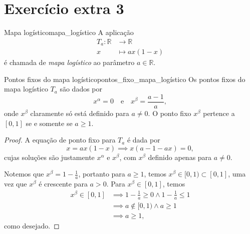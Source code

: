 \section*{Exercício extra 3}
\begin{definition}{Mapa logístico}{mapa_logístico}
    A aplicação
    \begin{align*}
        T_a : \mathbb{R} &\to \mathbb{R}\\
                       x &\mapsto ax(1 - x)
    \end{align*}
    é chamada de \emph{mapa logístico} ao parâmetro \(a \in \mathbb{R}\).
\end{definition}

\begin{proposition}{Pontos fixos do mapa logístico}{pontos_fixo_mapa_logístico}
    Os pontos fixos do mapa logístico \(T_a\) são dados por
    \begin{equation*}
        x^\alpha = 0 \quad\text{e}\quad x^\beta = \frac{a-1}{a},
    \end{equation*}
    onde \(x^\beta\) claramente só está definido para \(a \neq 0\). O ponto fixo \(x^\beta\) pertence a \([0,1]\) se e somente se \(a \geq 1\).
\end{proposition}
\begin{proof}
    A equação de ponto fixo para \(T_a\) é dada por
    \begin{equation*}
        x = ax(1 - x) \implies x(a - 1 - ax) = 0,
    \end{equation*}
    cujas soluções são justamente \(x^\alpha\) e \(x^\beta\), com \(x^\beta\) definido apenas para \(a \neq 0\).

    Notemos que \(x^\beta = 1 - \frac1a\), portanto para \(a \geq 1\), temos \(x^\beta \in [0,1) \subset [0,1]\), uma vez que \(x^\beta\) é crescente para \(a > 0\). Para \(x^\beta \in [0,1]\), temos
    \begin{align*}
        x^\beta \in [0,1] &\implies 1 - \frac{1}{a} \geq 0 \land 1 - \frac{1}{a} \leq 1\\
                          &\implies a \notin [0, 1) \land a \geq 1\\
                          &\implies a \geq 1,
    \end{align*}
    como desejado.
\end{proof}


